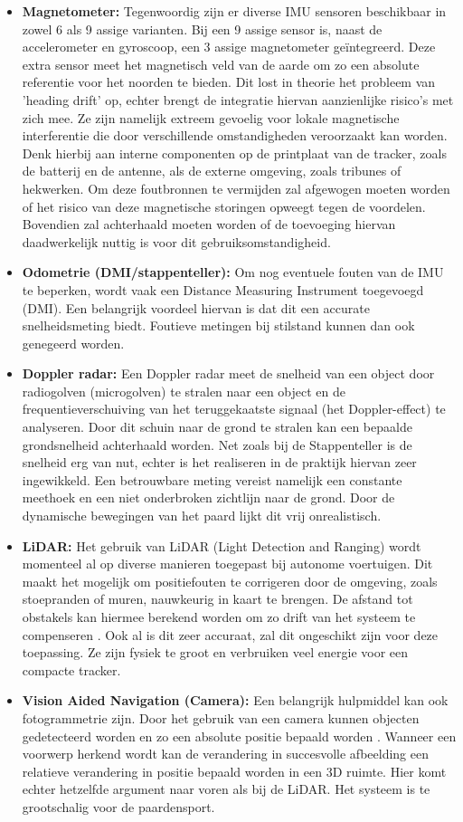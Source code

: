 \begin{itemize}
	\item  \textbf{Magnetometer:} Tegenwoordig zijn er diverse IMU sensoren beschikbaar in zowel 6 als 9 assige varianten. Bij een 9 assige sensor is, naast de accelerometer en gyroscoop, een 3 assige magnetometer geïntegreerd. Deze extra sensor meet het magnetisch veld van de aarde om zo een absolute referentie voor het noorden te bieden. Dit lost in theorie het probleem van 'heading drift' op, echter brengt de integratie hiervan aanzienlijke risico's met zich mee. Ze zijn namelijk extreem gevoelig voor lokale magnetische interferentie die door verschillende omstandigheden veroorzaakt kan worden. Denk hierbij aan interne componenten op de printplaat van de tracker, zoals de batterij en de antenne, als de externe omgeving, zoals tribunes of hekwerken. Om deze foutbronnen te vermijden zal afgewogen moeten worden of het risico van deze magnetische storingen opweegt tegen de voordelen. Bovendien zal achterhaald moeten worden of de toevoeging hiervan daadwerkelijk nuttig is voor dit gebruiksomstandigheid.
	\item \textbf{Odometrie (DMI/stappenteller):} Om nog eventuele fouten van de IMU te beperken, wordt vaak een Distance Measuring Instrument toegevoegd (DMI). Een belangrijk voordeel hiervan is dat dit een accurate snelheidsmeting biedt. Foutieve metingen bij stilstand kunnen dan ook genegeerd worden.
	\item \textbf{Doppler radar:} Een Doppler radar meet de snelheid van een object door radiogolven (microgolven) te stralen naar een object en de frequentieverschuiving van het teruggekaatste signaal (het Doppler-effect) te analyseren. Door dit schuin naar de grond te stralen kan een bepaalde grondsnelheid achterhaald worden. Net zoals bij de Stappenteller is de snelheid erg van nut, echter is het realiseren in de praktijk hiervan zeer ingewikkeld. Een betrouwbare meting vereist namelijk een constante meethoek en een niet onderbroken zichtlijn naar de grond. Door de dynamische bewegingen van het paard lijkt dit vrij onrealistisch.
	\item \textbf{LiDAR:} Het gebruik van LiDAR (Light Detection and Ranging) wordt momenteel al op diverse manieren toegepast bij autonome voertuigen. Dit maakt het mogelijk om positiefouten te corrigeren door de omgeving, zoals stoepranden of muren, nauwkeurig in kaart te brengen. De afstand tot obstakels kan hiermee berekend worden om zo drift van het systeem te compenseren \cite{Meng2017RobustLocalization}. Ook al is dit zeer accuraat, zal dit ongeschikt zijn voor deze toepassing. Ze zijn fysiek te groot en verbruiken veel energie voor een compacte tracker.
	\item  \textbf{Vision Aided Navigation (Camera):} Een belangrijk hulpmiddel kan ook fotogrammetrie zijn. Door het gebruik van een camera kunnen objecten gedetecteerd worden en zo een absolute positie bepaald worden \cite{NovAtelMultipath2026}. Wanneer een voorwerp herkend wordt kan de verandering in succesvolle afbeelding een relatieve verandering in positie bepaald worden in een 3D ruimte. Hier komt echter hetzelfde argument naar voren als bij de LiDAR. Het systeem is te grootschalig voor de paardensport.
\end{itemize}


\newpage
